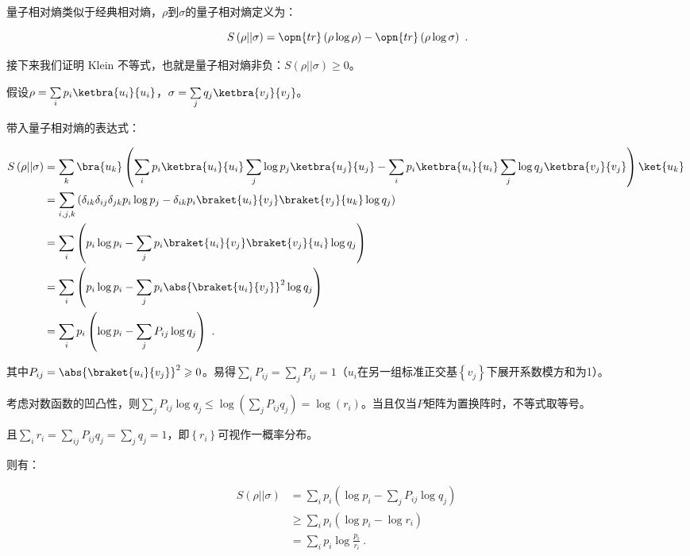 量子相对熵类似于经典相对熵，$\rho$到$\sigma$的量子相对熵定义为：

\begin{equation}
S\left(\rho || \sigma\right) = \opn{tr}\left(\rho \log \rho\right) - \opn{tr}\left(\rho \log \sigma\right)~.
\end{equation}

接下来我们证明 Klein 不等式，也就是量子相对熵非负：$S\left(\rho || \sigma\right) \geqslant 0$。

假设$\rho = \sum\limits_ip_i\ketbra{u_i}{u_i}$，$\sigma = \sum\limits_jq_j\ketbra{v_j}{v_j}$。

带入量子相对熵的表达式：

\begin{equation}
\begin{aligned}
S\left(\rho || \sigma\right) &= \sum_k \bra{u_k}\left( \sum_ip_i\ketbra{u_i}{u_i}\sum_j\log p_j\ketbra{u_j}{u_j} - \sum_ip_i\ketbra{u_i}{u_i}\sum_j\log q_j\ketbra{v_j}{v_j} \right)\ket{u_k} \\
&= \sum_{i,j,k}\left(\delta_{ik}\delta_{ij}\delta_{jk}p_i\log p_j - \delta_{ik}p_i \braket{u_i}{v_j}\braket{v_j}{u_k}\log q_j \right) \\
&= \sum_i\left( p_i\log p_i - \sum_jp_i\braket{u_i}{v_j}\braket{v_j}{u_i}\log q_j  \right) \\
&= \sum_i\left(p_i\log p_i - \sum_j p_i\abs{\braket{u_i}{v_j}}^2\log q_j \right) \\
&= \sum_ip_i\left(\log p_i - \sum_j P_{ij}\log q_j\right)~.
\end{aligned}~
\end{equation}

其中$P_{ij} = \abs{\braket{u_i}{v_j}}^2 \geqslant 0$。易得$\sum\limits_i P_{ij} = \sum\limits_j P_{ij} = 1$（$u_i$在另一组标准正交基$\left\{v_j\right\}$下展开系数模方和为1）。

考虑对数函数的凹凸性，则$\sum\limits_j P_{ij}\log q_j \leqslant \log\left(\sum\limits_j P_{ij}q_j\right) = \log \left(r_i\right)$。当且仅当$P$矩阵为置换阵时，不等式取等号。

且$\sum\limits_i r_i = \sum\limits_{ij}P_{ij}q_j = \sum\limits_jq_j = 1$，即$\left\{r_i\right\}$可视作一概率分布。

则有：

\begin{equation}\label{eq_vonNE_1}
\begin{aligned}
S\left(\rho || \sigma\right) &= \sum_i p_i\left(\log p_i - \sum_j P_{ij}\log q_j\right) \\ 
&\geqslant\sum_i p_i\left(\log p_i - \log r_i\right) \\
&= \sum_i p_i\log\frac{p_i}{r_i}~.
\end{aligned}~
\end{equation}


